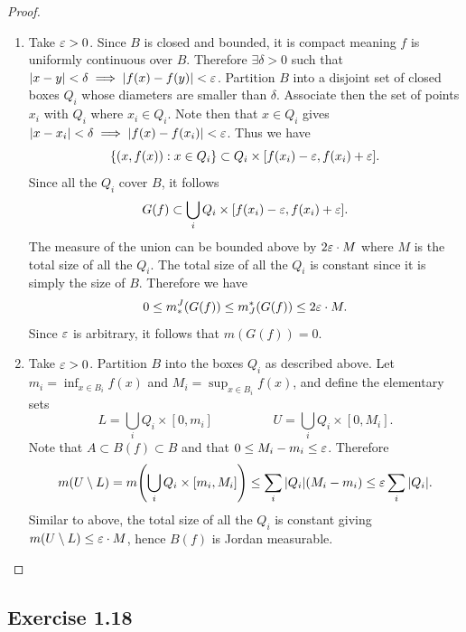 \documentclass[hw_all.tex]{subfiles}
\begin{document}
\begin{proof}
    \begin{enumerate}[label=\roman*)]
        \item 
            Take $\varepsilon > 0$. Since $B$ is closed and bounded, it is compact meaning $f$ is uniformly continuous over $B$. Therefore $\exists \delta > 0$ such that $|x-y| < \delta \implies |f(x) - f(y)| < \varepsilon$. Partition $B$ into a disjoint set of closed boxes $Q_i$ whose diameters are smaller than $\delta$. Associate then the set of points $x_i$ with $Q_i$ where $x_i \in Q_i$. Note then that $x \in Q_i$ gives $|x - x_i| < \delta \implies |f(x) - f(x_i)| < \varepsilon$. Thus we have
            \[
                \qty{(x,f(x)) : x \in Q_i} \subset Q_i \times [f(x_i) - \varepsilon, f(x_i) + \varepsilon]
            .\]
            Since all the $Q_i$ cover $B$, it follows
            \[
                G(f) \subset \bigcup_i Q_i \times [f(x_i) - \varepsilon, f(x_i) + \varepsilon]
            .\]
            The measure of the union can be bounded above by $2 \varepsilon \cdot M$ where $M$ is the total size of all the $Q_i$. The total size of all the $Q_i$ is constant since it is simply the size of $B$. Therefore we have
            \[
                0 \leq m_*^J(G(f)) \leq m^*_J(G(f)) \leq 2 \varepsilon \cdot M
            .\]
            Since $\varepsilon$ is arbitrary, it follows that $m(G(f)) = 0$.

        \item 
            Take $\varepsilon > 0$. Partition $B$ into the boxes $Q_i$ as described above. Let $m_i = \inf_{x \in B_i} f(x)$ and $M_i = \sup_{x \in B_i} f(x)$, and define the elementary sets
            \[
                L = \bigcup_{i} Q_i \times [0, m_i] \hspace{2cm} U = \bigcup_{i} Q_i \times [0, M_i].
            \]
            Note that $A \subset B(f) \subset B$ and that $0 \leq M_i - m_i \leq \varepsilon$. Therefore
            \[
                m(U \setminus L) = m\qty(\bigcup_i Q_i \times [m_i, M_i]) \leq \sum_i |Q_i| (M_i - m_i) \leq \varepsilon \sum_i |Q_i|
            .\]
            Similar to above, the total size of all the $Q_i$ is constant giving $m(U \setminus L) \leq \varepsilon \cdot M$, hence $B(f)$ is Jordan measurable.
    \end{enumerate}
\end{proof}

\subsection{Exercise 1.18}
\end{document}
